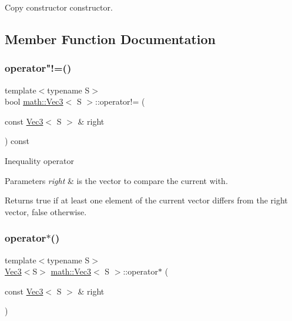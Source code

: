 Copy constructor constructor. 

\subsection{Member Function Documentation}
\mbox{\label{classmath_1_1_vec3_a98bca9bbb2161b89cf657bb6f7ae0699}} 
\subsubsection{\texorpdfstring{operator"!=()}{operator!=()}}
{\footnotesize\ttfamily template$<$typename S$>$ \\
bool \hyperlink{classmath_1_1_vec3}{math\+::\+Vec3}$<$ S $>$\+::operator!= (\begin{DoxyParamCaption}\item[{const \hyperlink{classmath_1_1_vec3}{Vec3}$<$ S $>$ \&}]{right }\end{DoxyParamCaption}) const\hspace{0.3cm}{\ttfamily [inline]}}

Inequality operator


\begin{DoxyParams}{Parameters}
{\em right} & is the vector to compare the current with.\\
\hline
\end{DoxyParams}
\begin{DoxyReturn}{Returns}
true if at least one element of the current vector differs from the right vector, false otherwise. 
\end{DoxyReturn}
\mbox{\label{classmath_1_1_vec3_aeafba08a1b074a3fc550c76b85e15f1b}} 
\subsubsection{\texorpdfstring{operator$\ast$()}{operator*()}\hspace{0.1cm}{\footnotesize\ttfamily [1/2]}}
{\footnotesize\ttfamily template$<$typename S$>$ \\
\hyperlink{classmath_1_1_vec3}{Vec3}$<$S$>$ \hyperlink{classmath_1_1_vec3}{math\+::\+Vec3}$<$ S $>$\+::operator$\ast$ (\begin{DoxyParamCaption}\item[{const \hyperlink{classmath_1_1_vec3}{Vec3}$<$ S $>$ \&}]{right }\end{DoxyParamCaption})\hspace{0.3cm}{\ttfamily [inline]}}

